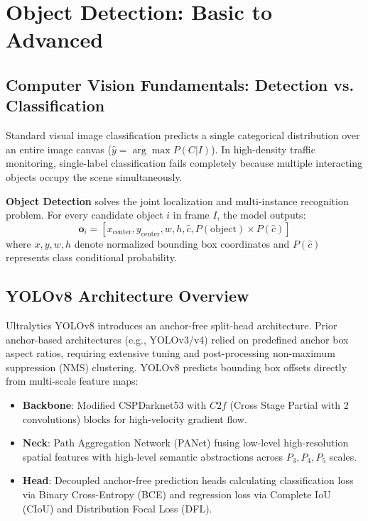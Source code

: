 \chapter{Object Detection: Basic to Advanced}

\section{Computer Vision Fundamentals: Detection vs. Classification}
Standard visual image classification predicts a single categorical distribution over an entire image canvas ($\hat{y} = \arg\max P(C|I)$). In high-density traffic monitoring, single-label classification fails completely because multiple interacting objects occupy the scene simultaneously.

\textbf{Object Detection} solves the joint localization and multi-instance recognition problem. For every candidate object $i$ in frame $I$, the model outputs:
\begin{equation}
\mathbf{o}_i = \left[ x_{\text{center}}, y_{\text{center}}, w, h, \hat{c}, P(\text{object}) \times P(\hat{c}) \right]
\end{equation}
where $x, y, w, h$ denote normalized bounding box coordinates and $P(\hat{c})$ represents class conditional probability.

\section{YOLOv8 Architecture Overview}
Ultralytics YOLOv8 introduces an anchor-free split-head architecture. Prior anchor-based architectures (e.g., YOLOv3/v4) relied on predefined anchor box aspect ratios, requiring extensive tuning and post-processing non-maximum suppression (NMS) clustering. YOLOv8 predicts bounding box offsets directly from multi-scale feature maps:
\begin{itemize}[leftmargin=*]
    \item \textbf{Backbone}: Modified CSPDarknet53 with $C2f$ (Cross Stage Partial with 2 convolutions) blocks for high-velocity gradient flow.
    \item \textbf{Neck}: Path Aggregation Network (PANet) fusing low-level high-resolution spatial features with high-level semantic abstractions across $P_3, P_4, P_5$ scales.
    \item \textbf{Head}: Decoupled anchor-free prediction heads calculating classification loss via Binary Cross-Entropy (BCE) and regression loss via Complete IoU (CIoU) and Distribution Focal Loss (DFL).
\end{itemize}

